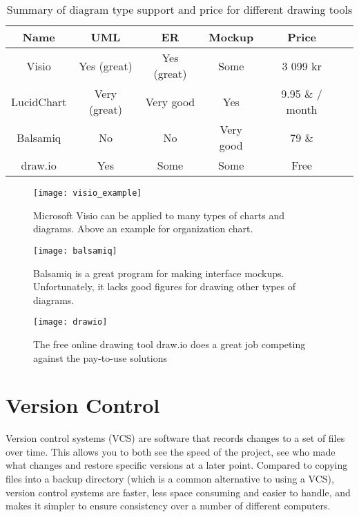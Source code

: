 \documentclass{report}
\begin{document}
\begin{table}
    \centering
    \begin{tabular}
        {c|ccccl} 
        Name & UML & ER & Mockup & Price\\ \hline
        Visio & Yes (great) & Yes (great) & Some & 3 099 kr\\
        LucidChart & Very (great) & Very good & Yes & 9.95 \& / month\\
        Balsamiq & No & No & Very good & 79 \& \\
        draw.io & Yes & Some & Some & Free \\ 
    \end{tabular}
\label{tab:illustrative_planning_summary} 
\caption{Summary of diagram type support and price for different drawing tools}
\end{table}

\begin{figure}
    \centering
    \texttt{[image: visio\_example]}
    \caption{Microsoft Visio can be applied to many types of charts and diagrams. Above an example for organization chart.}
    \label{fig:visio_example}
\end{figure}

\begin{figure}
    \centering
    \texttt{[image: balsamiq]}
    \caption{Balsamiq is a great program for making interface mockups. Unfortunately, it lacks good figures for drawing other types of diagrams.}
    \label{fig:balsamiq}
\end{figure}

\begin{figure}
    \centering
    \texttt{[image: drawio]}
    \caption{The free online drawing tool draw.io\cite{website:draw_io} does a great job competing against the pay-to-use solutions}
    \label{fig:drawio}
\end{figure}

\newpage
\section{Version Control}
Version control systems (VCS) are software that records changes to a set of files over time. This allows you to both see the speed of the project, see who made what changes and restore specific versions at a later point. Compared to copying files into a backup directory (which is a common alternative to using a VCS), version control systems are faster, less space consuming and easier to handle, and makes it simpler to ensure consistency over a number of different computers\cite{website:whats_versioncontrol}.\\ 
\end{document}
